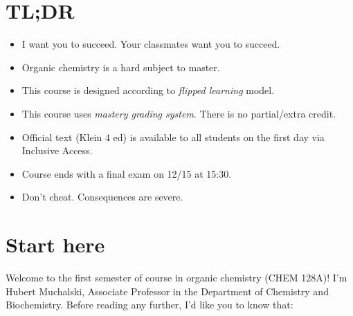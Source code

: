 \newpage

\hypertarget{tldr}{%
\section{TL;DR}\label{tldr}}

\begin{itemize}
\tightlist
\item
  I want you to succeed. Your classmates want you to succeed.
\item
  Organic chemistry is a hard subject to master.
\item
  This course is designed according to \emph{flipped learning} model.
\item
  This course uses \emph{mastery grading system}. There is no
  partial/extra credit.
\item
  Official text (Klein 4 ed) is available to all students on the first
  day via Inclusive Access.
\item
  Course ends with a final exam on 12/15 at 15:30.
\item
  Don't cheat. Consequences are severe.
\end{itemize}

\hypertarget{start-here}{%
\section{Start here}\label{start-here}}

Welcome to the first semester of course in organic chemistry (CHEM
128A)! I'm Hubert Muchalski, Associate Professor in the Department of
Chemistry and Biochemistry. Before reading any further, I'd like you to
know that:

